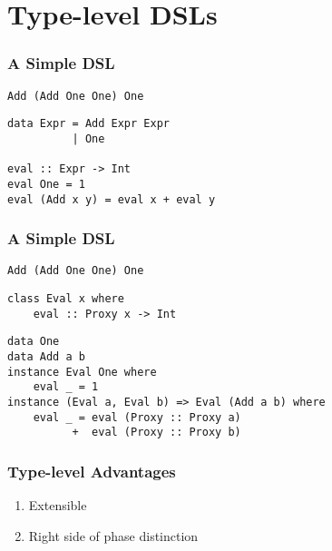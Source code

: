 \documentclass{beamer}
\begin{document}
\section{Type-level DSLs}

\begin{frame}[fragile]
\frametitle{A Simple DSL}

\begin{tcolorbox}
\begin{verbatim}
Add (Add One One) One
\end{verbatim}
\end{tcolorbox} \pause

\begin{verbatim}
data Expr = Add Expr Expr
          | One

eval :: Expr -> Int
eval One = 1
eval (Add x y) = eval x + eval y
\end{verbatim}
\end{frame}



\begin{frame}[fragile]
\frametitle{A Simple DSL}

\begin{tcolorbox}
\begin{verbatim}
Add (Add One One) One
\end{verbatim}
\end{tcolorbox}
\pause
\begin{verbatim}
class Eval x where
    eval :: Proxy x -> Int
\end{verbatim}
\pause
\begin{verbatim}
data One
data Add a b
instance Eval One where
    eval _ = 1
instance (Eval a, Eval b) => Eval (Add a b) where
    eval _ = eval (Proxy :: Proxy a)
          +  eval (Proxy :: Proxy b)
\end{verbatim}
\end{frame}


\begin{frame}
\frametitle{Type-level Advantages}
\begin{enumerate}
\item Extensible \pause
\item Right side of phase distinction
\end{enumerate}
\end{frame}
\end{document}
